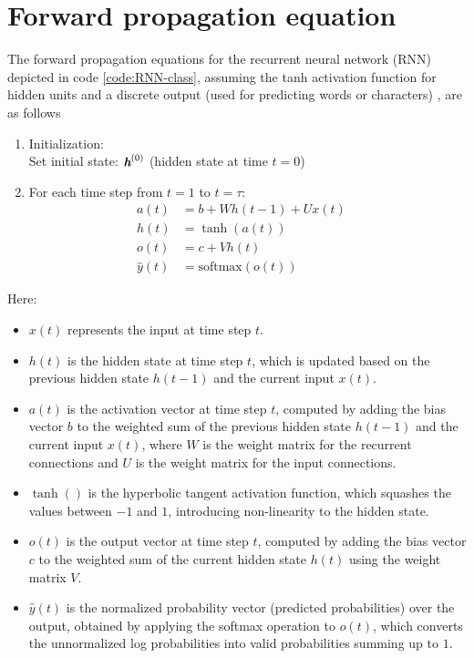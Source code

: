   

\section{Forward propagation equation} \label{sec:forward-propagation}
The forward propagation equations for the recurrent neural network (RNN) depicted in code \ref{code:RNN-class}, assuming the tanh activation function for hidden units and a discrete output (used for predicting words or characters) \parencite{Goodfellow-et-al-2016}, are as follows
\begin{enumerate}
    \item Initialization: \\
    Set initial state: $\textit{\textbf{h}}^{(0)}$ (hidden state at time $t=0$)
    \item For each time step from $t=1$ to $t=\tau$: \\
    \begin{align}
        a(t) &= b + Wh(t-1) + Ux(t) \quad  \\
        h(t) &= \tanh(a(t)) \quad  \\
        o(t) &= c + Vh(t) \quad  \\
        \hat{y}(t) &= \text{softmax}(o(t)) \quad 
        \end{align}
\end{enumerate}

Here:
\begin{itemize}
  \item $x(t)$ represents the input at time step $t$.
  \item $h(t)$ is the hidden state at time step $t$, which is updated based on the previous hidden state $h(t-1)$ and the current input $x(t)$.
  \item $a(t)$ is the activation vector at time step $t$, computed by adding the bias vector $b$ to the weighted sum of the previous hidden state $h(t-1)$ and the current input $x(t)$, where $W$ is the weight matrix for the recurrent connections and $U$ is the weight matrix for the input connections.
  \item $\tanh()$ is the hyperbolic tangent activation function, which squashes the values between $-1$ and $1$, introducing non-linearity to the hidden state.
  \item $o(t)$ is the output vector at time step $t$, computed by adding the bias vector $c$ to the weighted sum of the current hidden state $h(t)$ using the weight matrix $V$.
  \item $\hat{y}(t)$ is the normalized probability vector (predicted probabilities) over the output, obtained by applying the softmax operation to $o(t)$, which converts the unnormalized log probabilities into valid probabilities summing up to $1$.
\end{itemize}



